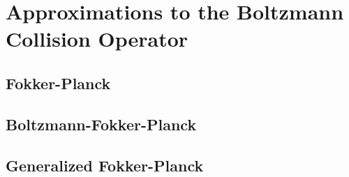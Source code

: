 \chapter{Approximations to the Boltzmann Collision Operator}

\section{Fokker-Planck}

\section{Boltzmann-Fokker-Planck}

\section{Generalized Fokker-Planck}